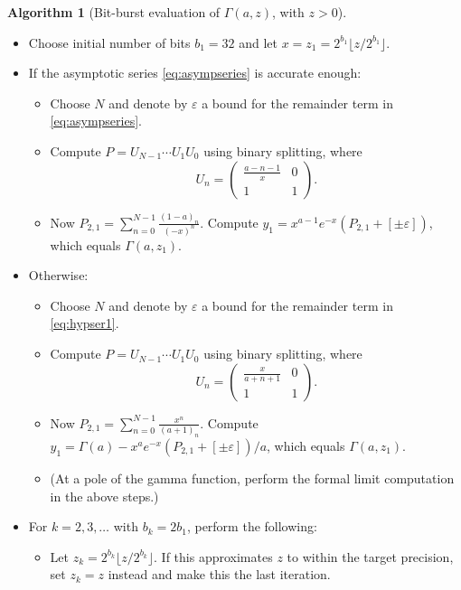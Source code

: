 \documentclass[reqno]{amsart}
\theoremstyle{definition}
\newtheorem{algorithm}[theorem]{Algorithm}
\begin{document}
\begin{algorithm}[Bit-burst evaluation of $\Gamma(a,z)$, with $z > 0$]{\ \\} 
\label{alg:bsplit1}
\renewcommand*{\arraystretch}{1.2}
\vspace{-0.8em}
\begin{itemize}
\item Choose initial number of bits $b_1 = 32$ and let $x = z_1 = 2^{b_1} \lfloor z / 2^{b_1} \rfloor$.
\item If the asymptotic series \eqref{eq:asympseries} is accurate enough:
\begin{itemize}
\item Choose $N$ and denote by $\varepsilon$ a bound for the remainder term in \eqref{eq:asympseries}.
\item Compute $P = U_{N-1} \cdots U_1 U_0$ using binary splitting, where $$U_n = \begin{pmatrix} \frac{a-n-1}{x} & 0 \\ 1 & 1 \end{pmatrix}.$$
\item Now $P_{2,1} = \sum_{n=0}^{N-1} \frac{(1-a)_n}{(-x)^n}$.
      Compute $y_1 = x^{a-1} e^{-x} (P_{2,1} + [\pm \varepsilon])$, which equals $\Gamma(a, z_1)$.
\end{itemize}
\item Otherwise:
\begin{itemize}
\item Choose $N$ and denote by $\varepsilon$ a bound for the remainder term in \eqref{eq:hypser1}.
\item Compute $P = U_{N-1} \cdots U_1 U_0$ using binary splitting, where $$U_n = \begin{pmatrix} \frac{x}{a+n+1} & 0 \\ 1 & 1 \end{pmatrix}.$$
\item Now $P_{2,1} = \sum_{n=0}^{N-1} \frac{x^n}{(a+1)_n}$.
      Compute $y_1 = \Gamma(a) - x^a e^{-x} (P_{2,1} + [\pm \varepsilon]) / a$, which equals $\Gamma(a, z_1)$.
\item (At a pole of the gamma function, perform the formal limit computation in the above steps.)
\end{itemize}
\item For $k = 2, 3, \ldots$ with $b_k = 2 b_1$, perform the following:
\begin{itemize}
\item Let $z_k = 2^{b_k} \lfloor z / 2^{b_k} \rfloor$. If this approximates $z$ to within the target precision, set $z_k = z$ instead and make this the last iteration.

\end{itemize}
\end{itemize}
\end{algorithm}
\end{document}
